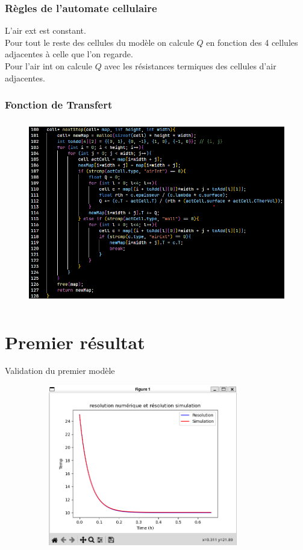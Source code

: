 \documentclass{beamer}
\begin{document}
\begin{frame}
    \frametitle{Règles de l'automate cellulaire}

    L'air ext est constant. \\[0.5cm]
    Pour tout le reste des cellules du modèle on calcule $Q$ en fonction des 4 cellules adjacentes à celle que l'on regarde.\\[0.5cm]
    Pour l'air int on calcule $Q$ avec les résistances termiques des cellules d'air adjacentes.

\end{frame}

\begin{frame}
    \frametitle{Fonction de Transfert}
    \begin{figure}
        \centering
        \includegraphics[width=12cm, height=8cm]{nextStep.png}
        \label{fig:nextStep}
    \end{figure}
\end{frame}

\section{Premier résultat}
\begin{frame}{Validation du premier modèle}
    \begin{figure}
        \centering
        \includegraphics[width=10cm, height=7cm]{courbe.png}
        \label{fig:courbe}
    \end{figure}
\end{frame}
\end{document}
